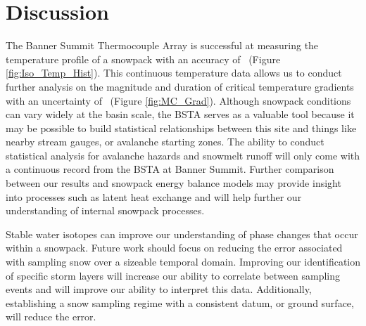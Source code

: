 \chapter{Discussion}

The Banner Summit Thermocouple Array is successful at measuring the temperature profile of a snowpack with an accuracy of \isostd \ (Figure \ref{fig:Iso_Temp_Hist}). This continuous temperature data allows us to conduct further analysis on the magnitude and duration of critical temperature gradients with an uncertainty of \gradstd \ (Figure \ref{fig:MC_Grad}). Although snowpack conditions can vary widely at the basin scale, the BSTA serves as a valuable tool because it may be possible to build statistical relationships between this site and things like nearby stream gauges, or avalanche starting zones. The ability to conduct statistical analysis for avalanche hazards and snowmelt runoff will only come with a continuous record from the BSTA at Banner Summit. Further comparison between our results and snowpack energy balance models may provide insight into processes such as latent heat exchange and will help further our understanding of internal snowpack processes. 

Stable water isotopes can improve our understanding of phase changes that occur within a snowpack. Future work should focus on reducing the error associated with sampling snow over a sizeable temporal domain. Improving our identification of specific storm layers will increase our ability to correlate between sampling events and will improve our ability to interpret this data. Additionally, establishing a snow sampling regime with a consistent datum, or ground surface, will reduce the error.   